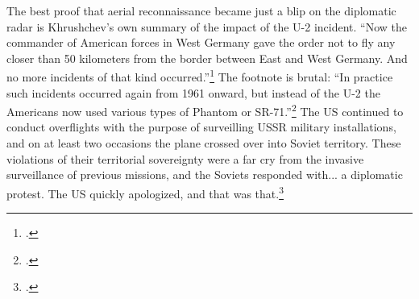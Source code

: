 \documentclass{report}
\begin{document}
\begin{refsegment}
The best proof that aerial reconnaissance became just a blip on the diplomatic radar is Khrushchev's own summary of the impact of the U-2 incident. ``Now the commander of American forces in West Germany gave the order not to fly any closer than 50 kilometers from the border between East and West Germany. And no more incidents of that kind occurred.''\footcite[p.~256]{khrushchev_memoirs_2007} The footnote is brutal: ``In practice such incidents occurred again from 1961 onward, but instead of the U-2 the Americans now used various types of Phantom or SR-71.''\footcite[p.~258]{khrushchev_memoirs_2007} The US continued to conduct overflights with the purpose of surveilling USSR military installations, and on at least two occasions the plane crossed over into Soviet territory. These violations of their territorial sovereignty were a far cry from the invasive surveillance of previous missions, and the Soviets responded with... a diplomatic protest. The US quickly apologized, and that was that.\footcite{orlov_u-2_2007}






\end{refsegment}
\end{document}
